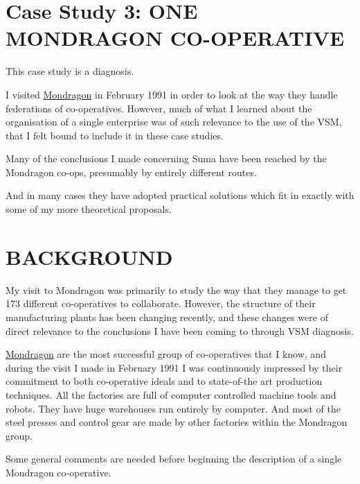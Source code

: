 \section*{Case Study 3: ONE MONDRAGON CO-OPERATIVE}
This case study is a diagnosis.

I visited \href{https://www.mondragon-corporation.com/en/}{Mondragon} in February 1991 in order to look at the way they handle federations of co-operatives. However, much of what I learned about the organisation of a single enterprise was of such relevance to the use of the VSM, that I felt bound to include it in these case studies.

Many of the conclusions I made concerning Suma have been reached by the Mondragon co-ops, presumably by entirely different routes.

And in many cases they have adopted practical solutions which fit in exactly with some of my more theoretical proposals.

\section*{BACKGROUND}
My visit to Mondragon was primarily to study the way that they manage to get 173 different co-operatives to collaborate. However, the structure of their manufacturing plants has been changing recently, and these changes were of direct relevance to the conclusions I have been coming to through VSM diagnosis.

\href{https://www.mondragon-corporation.com/en/}{Mondragon} are the most successful group of co-operatives that I know, and during the visit I made in February 1991 I was continuously impressed by their commitment to both co-operative ideals and to state-of-the art production techniques. All the factories are full of computer controlled machine tools and robots. They have huge warehouses run entirely by computer. And most of the steel presses and control gear are made by other factories within the Mondragon group.

Some general comments are needed before beginning the description of a single Mondragon co-operative.


